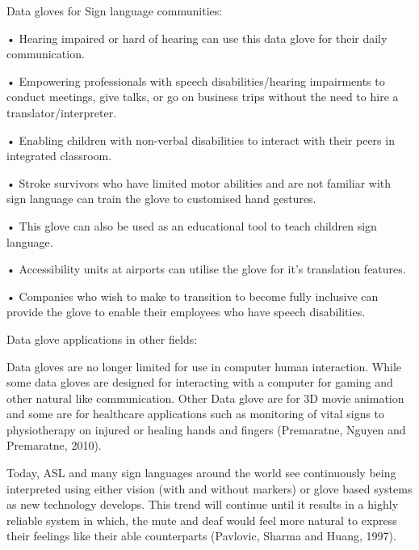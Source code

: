 Data gloves for Sign language communities:

•	Hearing impaired or hard of hearing can use this data glove for their daily communication.  

•	Empowering professionals with speech disabilities/hearing impairments to conduct meetings, give talks, or go on business trips without the need to hire a translator/interpreter. 

•	Enabling children with non-verbal disabilities to interact with their peers in integrated classroom. 

•	Stroke survivors who have limited motor abilities and are not familiar with sign language can train the glove to customised hand gestures. 

•	This glove can also be used as an educational tool to teach children sign language. 

•	Accessibility units at airports can utilise the glove for it’s translation features.

•	Companies who wish to make to transition to become fully inclusive can provide the glove to enable their employees who have speech disabilities. 

Data glove applications in other fields:

Data gloves are no longer limited for use in computer human interaction. While some data gloves are designed for interacting with a computer for gaming and other natural like communication. Other Data glove are for 3D movie animation and some are for healthcare applications such as monitoring of vital signs to physiotherapy on injured or healing hands and fingers (Premaratne, Nguyen and Premaratne, 2010). 

Today, ASL and many sign languages around the world see continuously being interpreted using either vision (with and without markers) or glove based systems as new technology develops. This trend will continue until it results in a highly reliable system in which, the mute and deaf would feel more natural to express their feelings like their able counterparts (Pavlovic, Sharma and Huang, 1997).





